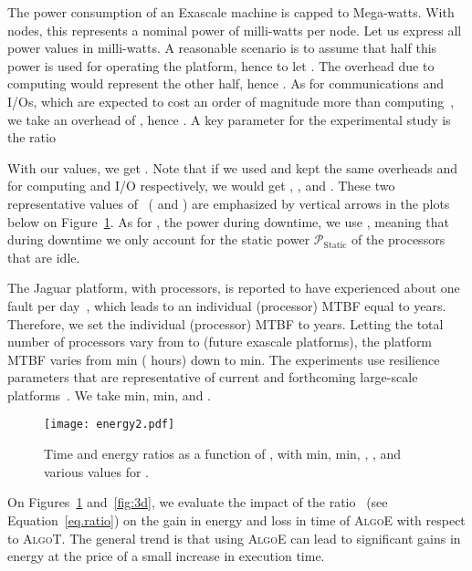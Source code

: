 \documentclass[a4paper]{article}
\newcommand{\ema}[1]{\ensuremath{#1}\xspace}
\newcommand{\power}[1][]{\ema{\mathcal{P}_{\text{#1}}}}
\newcommand{\pStatic}{\power[Static]}
\newcommand{\algoE}{\textsc{AlgoE}\xspace}
\newcommand{\algoT}{\textsc{AlgoT}\xspace}
\begin{document}
The power consumption of an Exascale machine is capped to  Mega-watts. With  nodes,
this represents a nominal power of  milli-watts per node. Let us express all power values in milli-watts.
A reasonable scenario is to assume that half this power is used for operating the platform,
hence to let . The overhead due to computing would represent the other half, hence
. As for communications and I/Os, which are expected to cost an order of magnitude
more than computing~\cite{Shalf2011}, we take an overhead of , hence .
A key parameter for the experimental study is the ratio 



With our values,  we get . 
Note that if we used  and kept the same overheads
 and  for computing and I/O respectively, we would get ,
, and . These two representative 
values of~ ( and ) are emphasized 
by vertical arrows in the plots below on Figure~\ref{fig:energytime}.
As for , the power during downtime, we use , meaning that during downtime we only
account for the static power \pStatic of the processors that are idle.


The Jaguar platform, with  processors, is
reported to have experienced about one fault per day~\cite{6264677},
which leads to an individual (processor) MTBF  equal
to  years. Therefore, we set the
individual (processor) MTBF to  years. Letting
the total number of processors  vary from  to
 (future exascale platforms), the platform MTBF  varies 
from  min ( hours) down to  min.
The experiments use resilience parameters that are representative of current and forthcoming
large-scale platforms~\cite{Ferreira2011,j116}.  We take  min,  
 min, and .



\begin{figure}[t]
    \centering
    \texttt{[image: energy2.pdf]}
    \caption{Time and energy ratios as a function of ,
with  min,  min, , ,
      and various values for .}
    \label{fig:energytime}
\end{figure}


On Figures~\ref{fig:energytime} and~\ref{fig:3d}, we evaluate the impact of the 
ratio~ (see Equation~\eqref{eq.ratio}) on the gain 
in energy and loss in time of \algoE with respect to \algoT. The general trend is that using 
\algoE can lead to significant gains in energy at the price of a small increase in execution time.
\end{document}
